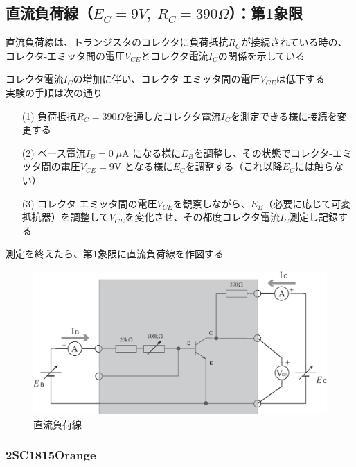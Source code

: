 \documentclass[uplatex,a4paper,11pt,oneside,openany]{jsbook}
\begin{document}
\newpage

\subsection{直流負荷線（$E_C=9V,\;R_C=390\Omega$）：第1象限}

直流負荷線は、トランジスタのコレクタに負荷抵抗$R_C$が接続されている時の、
コレクタ-エミッタ間の電圧$V_{CE}$とコレクタ電流$I_C$の関係を示している

コレクタ電流$I_C$の増加に伴い、コレクタ-エミッタ間の電圧$V_{CE}$は低下する\\

実験の手順は次の通り

\begin{enumerate}
\item[(1)] 負荷抵抗$R_C=390\Omega$を通したコレクタ電流$I_C$を測定できる様に接続を変更する
\item[(2)] ベース電流$I_B=0\;\mu$A になる様に$E_B$を調整し、その状態でコレクタ-エミッタ間の電圧$V_{CE}=9$V となる様に$E_C$を調整する（これ以降$E_C$には触らない）
\item[(3)] コレクタ-エミッタ間の電圧$V_{CE}$を観察しながら、$E_B$（必要に応じて可変抵抗器）を調整して$V_{CE}$を変化させ、その都度コレクタ電流$I_C$測定し記録する  
\end{enumerate}

測定を終えたら、第1象限に直流負荷線を作図する

\vfill

\begin{figure}[H]
  \centering
   \includegraphics[keepaspectratio, scale=0.5, angle=0]
               {figs/eps/ex4.eps}
               \caption{直流負荷線}
               \label{fig:ex3}
\end{figure}

\vfill

\newpage

\subsubsection{2SC1815Orange}
\end{document}

